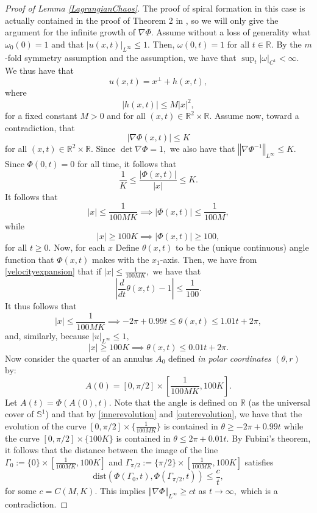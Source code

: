 \documentclass[10pt]{article}
\numberwithin{equation}{section}
\theoremstyle{plain}
\theoremstyle{definition}
\newcommand{\norm}[1]{\left\Vert #1 \right\Vert}
\numberwithin{equation}{section}
\begin{document}
\begin{proof}[Proof of Lemma \ref{LagrangianChaos}]
The proof of spiral formation in this case is actually contained in the proof of Theorem 2 in \cite{EJSVPII}, so we will only give the argument for the infinite growth of $\nabla \Phi.$
Assume without a loss of generality what $\omega_0(0)=1$ and that $|u(x,t)|_{L^\infty}\leq 1.$ Then, $\omega(0,t)=1$ for all $t\in\mathbb{R}.$ By the $m$-fold symmetry assumption and the assumption, we have that $\sup_t|\omega|_{C^1}<\infty$. We thus have that
\begin{equation}\label{velocityexpansion} u(x,t)=x^\perp + h(x,t),\end{equation} where
\[|h(x,t)|\leq M|x|^2,\] for a fixed constant $M>0$ and for all $(x,t)\in\mathbb{R}^2\times\mathbb{R}.$ Assume now, toward a contradiction, that \[|\nabla\Phi(x,t)|\leq K\] for all $(x,t)\in \mathbb{R}^2\times \mathbb{R}.$ Since $\det{\nabla\Phi}=1,$ we also have that $\norm{\nabla\Phi^{-1}}_{L^\infty}\leq K.$ Since $\Phi(0,t)=0$ for all time, it follows that  
\[\frac{1}{K}\leq \frac{|\Phi(x,t)|}{|x|}\leq K.\] It follows that \[|x|\leq \frac{1}{100 M K}\implies |\Phi(x,t)|\leq \frac{1}{100M},\] while
\[|x|\geq 100K\implies |\Phi(x,t)|\geq 100,\]for all $t\geq 0.$ Now, for each $x$ Define $\theta(x,t)$ to be the (unique continuous) angle function that $\Phi(x,t)$ makes with the $x_1$-axis.  Then, we have from \eqref{velocityexpansion} that if $|x|\leq \frac{1}{100MK},$ we have that 
\[|\frac{d}{dt}\theta(x,t)-1|\leq \frac{1}{100}.\] It thus follows that 
\begin{equation}\label{innerevolution}|x|\leq \frac{1}{100MK}\implies -2\pi+0.99t\leq \theta(x,t)\leq 1.01 t+2\pi,\end{equation}
and, similarly, because $|u|_{L^\infty}\leq 1,$
\begin{equation}\label{outerevolution}|x|\geq 100K\implies \theta(x,t) \leq 0.01 t+2\pi.\end{equation} 
Now consider the quarter of an annulus $A_0$ defined \emph{in polar coordinates} $(\theta,r)$ by:
\[A(0)= [0,\pi/2]\times [\frac{1}{100MK}, 100K] .\] Let $A(t)=\Phi(A(0),t).$ Note that the angle is defined on $\mathbb{R}$ (as the universal cover of $\mathbb{S}^1$) and that by \eqref{innerevolution} and \eqref{outerevolution}, we have that the evolution of the curve $[0,\pi/2]\times \{\frac{1}{100MK}\}$ is contained in $\theta\geq -2\pi+0.99t$ while the curve $[0,\pi/2]\times \{100K\}$ is contained in $\theta\leq 2\pi+0.01t.$ By Fubini's theorem, it follows that the distance between the image of the line $\Gamma_0:=\{0\}\times [\frac{1}{100MK}, 100K]$ and $\Gamma_{\pi/2}:=\{\pi/2\}\times [\frac{1}{100MK}, 100K]$ satisfies
\[\text{dist}(\Phi(\Gamma_0,t), \Phi(\Gamma_{\pi/2},t))\leq \frac{c}{t},\] for some $c=C(M,K).$ This implies $\norm{\nabla \Phi}_{L^\infty}\geq c t$ as $t\rightarrow\infty,$ which is a contradiction. 

\end{proof}
\end{document}
